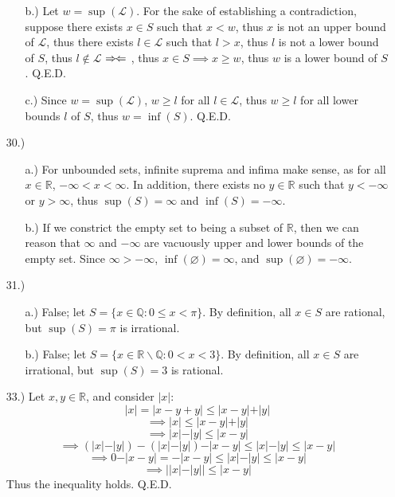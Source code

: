 \documentclass[12pt]{article}
\newcommand{\contradiction}{
    \ensuremath{{\Rightarrow\mspace{-2mu}\Leftarrow}}
}
\begin{document}
\begin{itemize}
\begin{itemize}
        \item [b.)] Let $w=\sup(\mathscr{L})$. For the sake of establishing a contradiction, suppose there exists $x\in S$ such that $x<w$, thus $x$ is not an upper bound of $\mathscr{L}$, thus there exists $l\in\mathscr{L}$ such that $l>x$, thus $l$ is not a lower bound of $S$, thus $l\notin\mathscr{L}$\contradiction, thus $x\in S\implies x\geq w$, thus $w$ is a lower bound of $S$. Q.E.D.

        \item [c.)] Since $w=\sup(\mathscr{L})$, $w\geq l$ for all $l\in\mathscr{L}$, thus $w\geq l$ for all lower bounds $l$ of $S$, thus $w=\inf(S)$. Q.E.D.
    \end{itemize}

    \item [30.)] \begin{itemize}
        \item [a.)] For unbounded sets, infinite suprema and infima make sense, as for all $x\in\mathbb{R}$, $-\infty<x<\infty$. In addition, there exists no $y\in\mathbb{R}$ such that $y<-\infty$ or $y>\infty$, thus $\sup(S)=\infty$ and $\inf(S)=-\infty$.

        \item [b.)] If we constrict the empty set to being a subset of $\mathbb{R}$, then we can reason that $\infty$ and $-\infty$ are vacuously upper and lower bounds of the empty set. Since $\infty>-\infty$, $\inf(\varnothing)=\infty$, and $\sup(\varnothing)=-\infty$.
    \end{itemize}

    \pagebreak
    \item [31.)] \begin{itemize}
        \item [a.)] False; let $S=\{x\in\mathbb{Q}:0\leq x<\pi\}$. By definition, all $x\in S$ are rational, but $\sup(S)=\pi$ is irrational.

        \item [b.)] False; let $S=\{x\in\mathbb{R}\backslash\mathbb{Q}:0<x<3\}$. By definition, all $x\in S$ are irrational, but $\sup(S)=3$ is rational.
    \end{itemize}

    \item [33.)] Let $x,y\in\mathbb{R}$, and consider $\vert x\vert$:
        \[\vert x\vert=\vert x-y+y\vert\leq\vert x-y\vert+\vert y\vert\]
        \[\implies\vert x\vert\leq\vert x-y\vert+\vert y\vert\]
        \[\implies\vert x\vert-\vert y\vert\leq\vert x-y\vert\]
        \[\implies(\vert x\vert-\vert y\vert)-(\vert x\vert-\vert y\vert)-\vert x-y\vert\leq\vert x\vert-\vert y\vert\leq\vert x-y\vert\]
        \[\implies0-\vert x-y\vert=-\vert x-y\vert\leq\vert x\vert-\vert y\vert\leq\vert x-y\vert\]
        \[\implies\Big\vert\vert x\vert-\vert y\vert\Big\vert\leq\vert x-y\vert\]
        Thus the inequality holds. Q.E.D.


\end{itemize}
\end{document}
